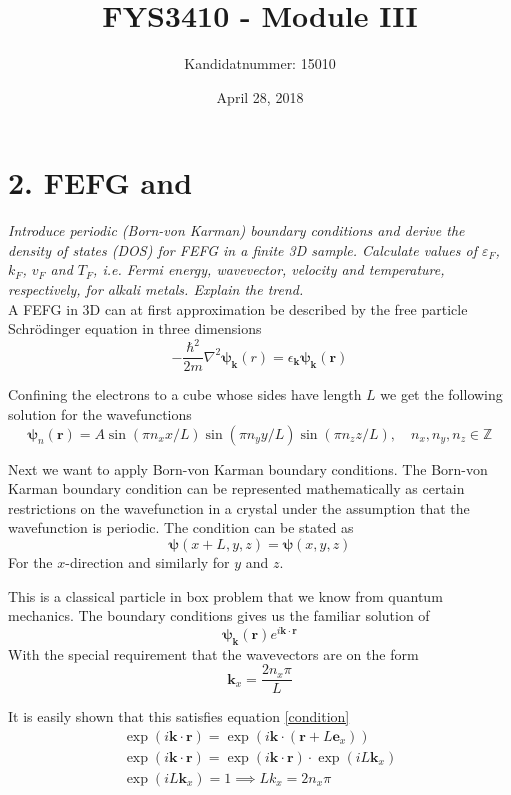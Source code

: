 \documentclass{article}
\author{Kandidatnummer: 15010}
\title{FYS3410 - Module III}
\date{April 28, 2018}
\begin{document}
\maketitle

\section*{2. FEFG and }
\emph{Introduce periodic (Born-von Karman) boundary conditions and derive the density of states (DOS) for FEFG in a finite 3D sample. Calculate values of $\varepsilon_F$, $k_F$, $v_F$ and $T_F$, i.e. Fermi energy, wavevector, velocity and temperature, respectively, for alkali metals. Explain the trend.}\\

A FEFG in 3D can at first approximation be described by the free particle Schrödinger equation in three dimensions
\begin{equation}
	-\frac{\hbar^2}{2m} \nabla^2 \bm{\psi_k}(r) = \epsilon_{\bm{k}}\bm{\psi_k}(\bm{r})
	\label{SE}
\end{equation}

Confining the electrons to a cube whose sides have length $L$ we get the following solution for the wavefunctions
\begin{equation}
	\bm{\psi}_n(\bm{r}) = A\sin(\pi n_xx/L)\sin(\pi n_yy/L)\sin(\pi n_zz/L), \quad n_x,n_y,n_z \in \mathbb{Z}
\end{equation}

Next we want to apply Born-von Karman boundary conditions. The Born-von Karman boundary condition can be represented mathematically as certain restrictions on the wavefunction in a crystal under the assumption that the wavefunction is periodic. The condition can be stated as
	\begin{equation}
		\bm{\psi}(x+L,y,z)=\bm{\psi}(x,y,z)
		\label{condition} 
	\end{equation}
For the $x$-direction and similarly for $y$ and $z$.

This is a classical particle in box problem that we know from quantum mechanics. The boundary conditions gives us the familiar solution of
\begin{equation}
	\bm{\psi_k}(\bm{r})e^{i\bm{k}\cdot\bm{r}}
	\label{pwave}
\end{equation}
With the special requirement that the wavevectors are on the form
$$ \bm{k}_x = \frac{2n_x\pi}{L} $$

It is easily shown that this satisfies equation \eqref{condition}
\begin{align*}
	\exp(i\bm{k}\cdot\bm{r}) = \exp(i\bm{k}\cdot(\bm{r}+L\bm{e}_x))\\
	\exp(i\bm{k}\cdot\bm{r}) = \exp(i\bm{k}\cdot\bm{r}) \cdot \exp(iL\bm k_x)\\
	\exp(iL\bm k_x) = 1 \implies Lk_x = 2n_x\pi
\end{align*}
\end{document}
